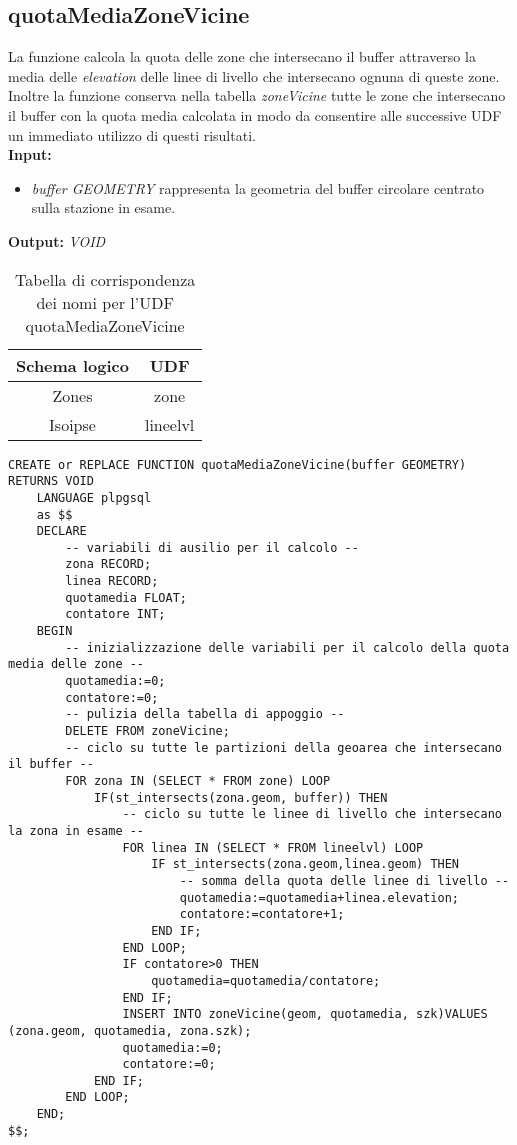 \subsection{quotaMediaZoneVicine}
La funzione calcola la quota delle zone che intersecano il buffer attraverso la media delle \textit{elevation} delle linee di livello che intersecano ognuna di queste zone. Inoltre la funzione conserva nella tabella \textit{zoneVicine} tutte le zone che intersecano il buffer con la quota media calcolata in modo da consentire alle successive UDF un immediato utilizzo di questi risultati.\\
\textbf{Input:} 
\begin{itemize}
\item \textit{buffer GEOMETRY} rappresenta la geometria del buffer circolare centrato sulla stazione in esame.
\end{itemize}
\textbf{Output:} \textit{VOID} 

\begin{table}[h]
\centering
\caption{Tabella di corrispondenza dei nomi per l'UDF quotaMediaZoneVicine}
\label{mapTb1}
\begin{tabular}{|c|c|}
\hline
Schema logico & UDF      \\ \hline
Zones         & zone     \\
Isoipse       & lineelvl \\ \hline
\end{tabular}
\end{table}

\begin{lstlisting}[style=mySQL]
CREATE or REPLACE FUNCTION quotaMediaZoneVicine(buffer GEOMETRY) RETURNS VOID
	LANGUAGE plpgsql
	as $$
	DECLARE
		-- variabili di ausilio per il calcolo --
		zona RECORD;
		linea RECORD;
		quotamedia FLOAT;
		contatore INT;
	BEGIN
		-- inizializzazione delle variabili per il calcolo della quota media delle zone --
		quotamedia:=0;
		contatore:=0;
		-- pulizia della tabella di appoggio --
		DELETE FROM zoneVicine;
		-- ciclo su tutte le partizioni della geoarea che intersecano il buffer --
		FOR zona IN (SELECT * FROM zone) LOOP
			IF(st_intersects(zona.geom, buffer)) THEN
				-- ciclo su tutte le linee di livello che intersecano la zona in esame --
				FOR linea IN (SELECT * FROM lineelvl) LOOP
					IF st_intersects(zona.geom,linea.geom) THEN
						-- somma della quota delle linee di livello --
						quotamedia:=quotamedia+linea.elevation;
						contatore:=contatore+1;
					END IF;
				END LOOP;
				IF contatore>0 THEN
					quotamedia=quotamedia/contatore;
				END IF;
				INSERT INTO zoneVicine(geom, quotamedia, szk)VALUES (zona.geom, quotamedia, zona.szk);
				quotamedia:=0;
				contatore:=0;
			END IF;
		END LOOP;
	END;
$$;
\end{lstlisting}

